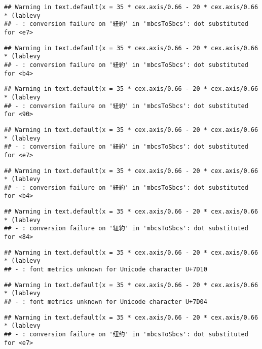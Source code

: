 \documentclass[
]{article}
\begin{document}
\begin{verbatim}
## Warning in text.default(x = 35 * cex.axis/0.66 - 20 * cex.axis/0.66 * (lablevy
## - : conversion failure on '紐約' in 'mbcsToSbcs': dot substituted for <e7>
\end{verbatim}

\begin{verbatim}
## Warning in text.default(x = 35 * cex.axis/0.66 - 20 * cex.axis/0.66 * (lablevy
## - : conversion failure on '紐約' in 'mbcsToSbcs': dot substituted for <b4>
\end{verbatim}

\begin{verbatim}
## Warning in text.default(x = 35 * cex.axis/0.66 - 20 * cex.axis/0.66 * (lablevy
## - : conversion failure on '紐約' in 'mbcsToSbcs': dot substituted for <90>
\end{verbatim}

\begin{verbatim}
## Warning in text.default(x = 35 * cex.axis/0.66 - 20 * cex.axis/0.66 * (lablevy
## - : conversion failure on '紐約' in 'mbcsToSbcs': dot substituted for <e7>
\end{verbatim}

\begin{verbatim}
## Warning in text.default(x = 35 * cex.axis/0.66 - 20 * cex.axis/0.66 * (lablevy
## - : conversion failure on '紐約' in 'mbcsToSbcs': dot substituted for <b4>
\end{verbatim}

\begin{verbatim}
## Warning in text.default(x = 35 * cex.axis/0.66 - 20 * cex.axis/0.66 * (lablevy
## - : conversion failure on '紐約' in 'mbcsToSbcs': dot substituted for <84>
\end{verbatim}

\begin{verbatim}
## Warning in text.default(x = 35 * cex.axis/0.66 - 20 * cex.axis/0.66 * (lablevy
## - : font metrics unknown for Unicode character U+7D10
\end{verbatim}

\begin{verbatim}
## Warning in text.default(x = 35 * cex.axis/0.66 - 20 * cex.axis/0.66 * (lablevy
## - : font metrics unknown for Unicode character U+7D04
\end{verbatim}

\begin{verbatim}
## Warning in text.default(x = 35 * cex.axis/0.66 - 20 * cex.axis/0.66 * (lablevy
## - : conversion failure on '纽约' in 'mbcsToSbcs': dot substituted for <e7>
\end{verbatim}
\end{document}
